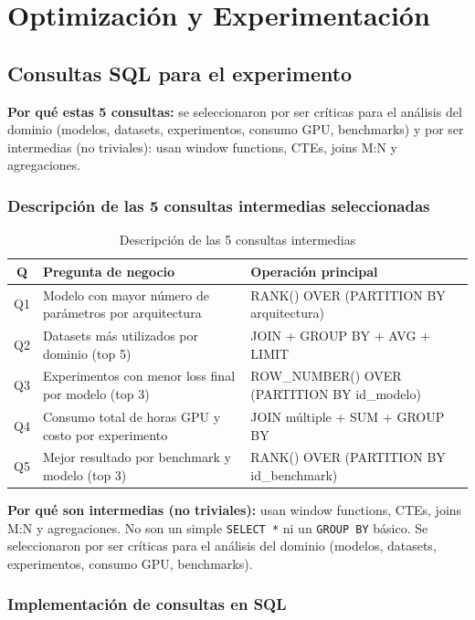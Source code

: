 \documentclass[12pt,a4paper]{article}
\begin{document}
\section{Optimización y Experimentación}

\subsection{Consultas SQL para el experimento}

\textbf{Por qué estas 5 consultas:} se seleccionaron por ser críticas para el análisis del dominio (modelos, datasets, experimentos, consumo GPU, benchmarks) y por ser intermedias (no triviales): usan window functions, CTEs, joins M:N y agregaciones.

\subsubsection{Descripción de las 5 consultas intermedias seleccionadas}

\begin{table}[H]
\centering
\begin{tabular}{|c|l|l|}
\hline
\textbf{Q} & \textbf{Pregunta de negocio} & \textbf{Operación principal} \\
\hline
Q1 & Modelo con mayor número de parámetros por arquitectura & RANK() OVER (PARTITION BY arquitectura) \\
Q2 & Datasets más utilizados por dominio (top 5) & JOIN + GROUP BY + AVG + LIMIT \\
Q3 & Experimentos con menor loss final por modelo (top 3) & ROW\_NUMBER() OVER (PARTITION BY id\_modelo) \\
Q4 & Consumo total de horas GPU y costo por experimento & JOIN múltiple + SUM + GROUP BY \\
Q5 & Mejor resultado por benchmark y modelo (top 3) & RANK() OVER (PARTITION BY id\_benchmark) \\
\hline
\end{tabular}
\caption{Descripción de las 5 consultas intermedias}
\end{table}

\textbf{Por qué son intermedias (no triviales):} usan window functions, CTEs, joins M:N y agregaciones. No son un simple \texttt{SELECT *} ni un \texttt{GROUP BY} básico. Se seleccionaron por ser críticas para el análisis del dominio (modelos, datasets, experimentos, consumo GPU, benchmarks).

\subsubsection{Implementación de consultas en SQL}
\end{document}
